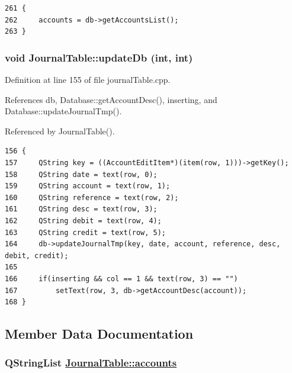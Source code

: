 \footnotesize\begin{verbatim}261 {
262     accounts = db->getAccountsList();
263 }
\end{verbatim}\normalsize 


\hypertarget{classJournalTable_k0}{
\subsubsection[updateDb]{\setlength{\rightskip}{0pt plus 5cm}void Journal\-Table::update\-Db (int, int)}}
\label{classJournalTable_k0}


Definition at line 155 of file journal\-Table.cpp.

References db, Database::get\-Account\-Desc(), inserting, and Database::update\-Journal\-Tmp().

Referenced by Journal\-Table().

\footnotesize\begin{verbatim}156 {
157     QString key = ((AccountEditItem*)(item(row, 1)))->getKey();
158     QString date = text(row, 0);
159     QString account = text(row, 1);
160     QString reference = text(row, 2);
161     QString desc = text(row, 3);
162     QString debit = text(row, 4);
163     QString credit = text(row, 5);
164     db->updateJournalTmp(key, date, account, reference, desc, debit, credit);
165 
166     if(inserting && col == 1 && text(row, 3) == "")
167         setText(row, 3, db->getAccountDesc(account));
168 }
\end{verbatim}\normalsize 




\subsection{Member Data Documentation}
\hypertarget{classJournalTable_r5}{
\subsubsection[accounts]{\setlength{\rightskip}{0pt plus 5cm}QString\-List \hyperlink{classJournalTable_r5}{Journal\-Table::accounts}}}
\label{classJournalTable_r5}


